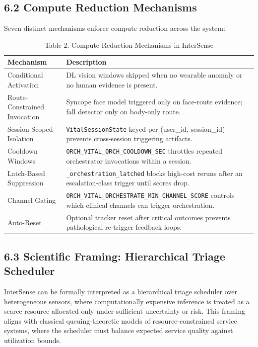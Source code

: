 \documentclass[11pt,a4paper]{article}
\begin{document}
\subsection{6.2 Compute Reduction Mechanisms}
Seven distinct mechanisms enforce compute reduction across the system:

\begin{table}[h!]
  \centering
  \renewcommand{\arraystretch}{1.2}
  \begin{tabular}{|p{4cm}|p{10cm}|}
    \hline
    \rowcolor{gray!20}\textbf{Mechanism} & \textbf{Description} \\
    \hline
    Conditional Activation & DL vision windows skipped when no wearable anomaly or no human evidence is present. \\
    \hline
    Route-Constrained Invocation & Syncope face model triggered only on face-route evidence; fall detector only on body-only route. \\
    \hline
    Session-Scoped Isolation & \texttt{VitalSessionState} keyed per (user\_id, session\_id) prevents cross-session triggering artifacts. \\
    \hline
    Cooldown Windows & \texttt{ORCH\_VITAL\_ORCH\_COOLDOWN\_SEC} throttles repeated orchestrator invocations within a session. \\
    \hline
    Latch-Based Suppression & \texttt{\_orchestration\_latched} blocks high-cost reruns after an escalation-class trigger until scores drop. \\
    \hline
    Channel Gating & \texttt{ORCH\_VITAL\_ORCHESTRATE\_MIN\_CHANNEL\_SCORE} controls which clinical channels can trigger orchestration. \\
    \hline
    Auto-Reset & Optional tracker reset after critical outcomes prevents pathological re-trigger feedback loops. \\
    \hline
  \end{tabular}
  \caption{Table 2. Compute Reduction Mechanisms in InterSense}
\end{table}

\subsection{6.3 Scientific Framing: Hierarchical Triage Scheduler}
InterSense can be formally interpreted as a hierarchical triage scheduler over heterogeneous sensors, where computationally expensive inference is treated as a scarce resource allocated only under sufficient uncertainty or risk. This framing aligns with classical queuing-theoretic models of resource-constrained service systems, where the scheduler must balance expected service quality against utilization bounds.
\end{document}
